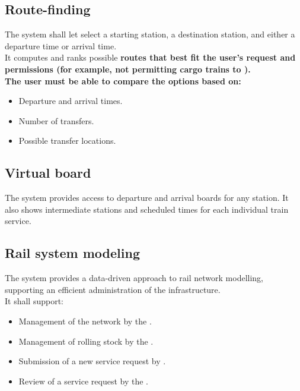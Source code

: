 \subsection*{Route-finding}
The system shall let  select a starting station, a destination station, and either a departure time or arrival time.\\
It computes and ranks possible \bf{routes} that best fit the user's request and permissions
(for example, not permitting cargo trains to ).\\
The user must be able to compare the options based on:
\begin{itemize}
    \item Departure and arrival times.
    \item Number of transfers.
    \item Possible transfer locations.
\end{itemize}

\subsection*{Virtual board}
The system provides  access to departure and arrival boards for any station. It also shows intermediate stations and scheduled times for each 
individual train service.

\subsection*{Rail system modeling}
The system provides a data-driven approach to rail network modelling, supporting an efficient administration of the infrastructure.\\
It shall support:
\begin{itemize}
    \item Management of the network by the .
    \item Management of rolling stock by the .
    \item Submission of a new service request by .
    \item Review of a service request by the .
\end{itemize}

\newpage

{}
